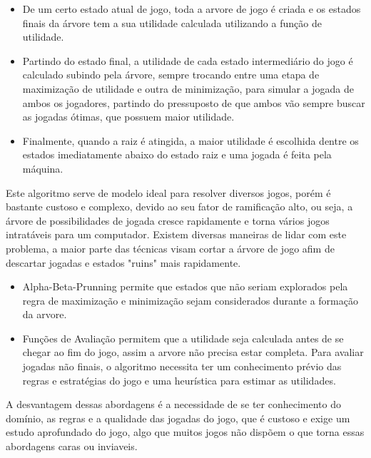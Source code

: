 \begin{itemize}

   \item De um certo estado atual de jogo, toda a arvore de jogo é criada e os estados finais da árvore tem a sua utilidade calculada utilizando a função de utilidade. 
   \item Partindo do estado final, a utilidade de cada estado intermediário do jogo é calculado subindo pela árvore, sempre trocando entre uma etapa de maximização de utilidade e outra de minimização, para simular a jogada de ambos os jogadores, partindo do pressuposto de que ambos vão sempre buscar as jogadas ótimas, que possuem maior utilidade.
   \item Finalmente, quando a raiz é atingida, a maior utilidade é escolhida dentre os estados imediatamente abaixo do estado raiz e uma jogada é feita pela máquina.
   
\end{itemize}

Este algoritmo serve de modelo ideal para resolver diversos jogos, porém é bastante custoso e complexo, devido ao seu fator de ramificação alto, ou seja, a árvore de possibilidades de jogada cresce rapidamente e torna vários jogos intratáveis para um computador. 
Existem diversas maneiras de lidar com este problema, a maior parte das técnicas visam cortar a árvore de jogo afim de descartar jogadas e estados "ruins" mais rapidamente.

\begin{itemize}

   \item Alpha-Beta-Prunning permite que estados que não seriam explorados pela regra de maximização e minimização sejam considerados durante a formação da arvore. 
   \item Funções de Avaliação permitem que a utilidade seja calculada antes de se chegar ao fim do jogo, assim a arvore não precisa estar completa. Para avaliar jogadas não finais, o algoritmo necessita ter um conhecimento prévio das regras e estratégias do jogo e uma heurística para estimar as utilidades.
   
\end{itemize}

A desvantagem dessas abordagens é a necessidade de se ter conhecimento do domínio, as regras e a qualidade das jogadas do jogo, que é custoso e exige um estudo aprofundado do jogo, algo que muitos jogos não dispõem o que torna essas abordagens caras ou inviaveis.

